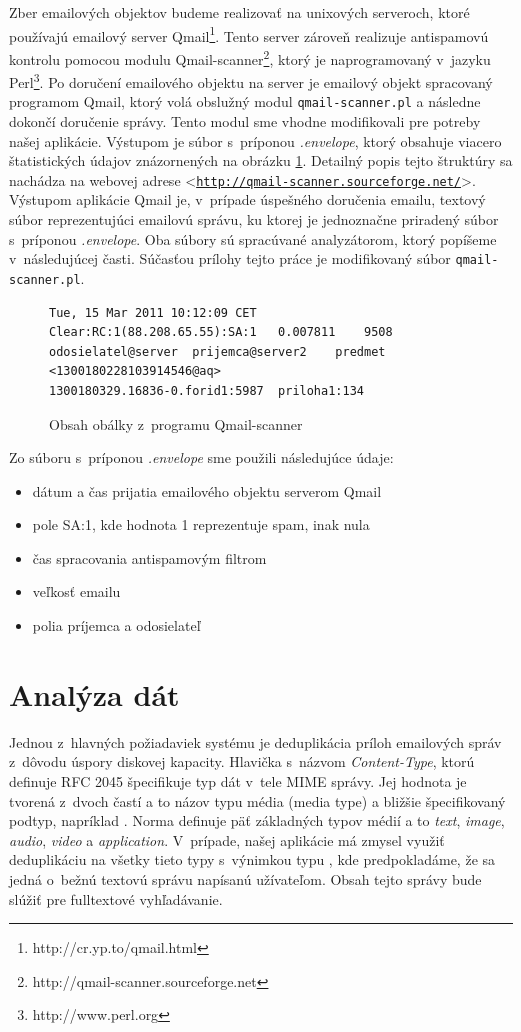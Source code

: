 \documentclass[11pt,twoside,a4paper]{book}
\let\oldUrl\url
\renewcommand\url[1]{<\texttt{\oldUrl{#1}}>}
\begin{document}
Zber emailových objektov budeme realizovať na unixových serveroch, ktoré používajú emailový server Qmail\footnote{http://cr.yp.to/qmail.html}. Tento server zároveň realizuje antispamovú kontrolu pomocou modulu Qmail-scanner\footnote{http://qmail-scanner.sourceforge.net}, ktorý je naprogramovaný v~jazyku Perl\footnote{http://www.perl.org}. Po doručení emailového objektu na server je emailový objekt spracovaný programom Qmail, ktorý volá obslužný modul \verb|qmail-scanner.pl| a následne dokončí doručenie správy. Tento modul sme vhodne modifikovali pre potreby našej aplikácie. Výstupom je súbor s~príponou \emph{.envelope}, ktorý obsahuje viacero štatistických údajov znázornených na obrázku \ref{fig:envelope}. Detailný popis tejto štruktúry sa nachádza na webovej adrese \url{http://qmail-scanner.sourceforge.net/}. Výstupom aplikácie Qmail je, v~prípade úspešného doručenia emailu, textový súbor reprezentujúci emailovú správu, ku ktorej je jednoznačne priradený súbor s~príponou \emph{.envelope}. Oba súbory sú spracúvané analyzátorom, ktorý popíšeme v~následujúcej časti. Súčasťou prílohy tejto práce je modifikovaný súbor \verb|qmail-scanner.pl|.

\begin{figure}[h]
\begin{verbatim}
Tue, 15 Mar 2011 10:12:09 CET	Clear:RC:1(88.208.65.55):SA:1	0.007811	9508	odosielatel@server	prijemca@server2	predmet	<1300180228103914546@aq>	
1300180329.16836-0.forid1:5987	priloha1:134
\end{verbatim}
 \caption{Obsah obálky z~programu Qmail-scanner}
 \label{fig:envelope}
\end{figure}

\noindent
Zo súboru s~príponou \emph{.envelope} sme použili následujúce údaje:
\begin{itemize}
 \item dátum a čas prijatia emailového objektu serverom Qmail
 \item pole SA:1, kde hodnota 1 reprezentuje spam, inak nula
 \item čas spracovania antispamovým filtrom
 \item veľkosť emailu
 \item polia príjemca a odosielateľ
\end{itemize}


\section{Analýza dát}
Jednou z~hlavných požiadaviek systému je deduplikácia príloh emailových správ z~dôvodu úspory diskovej kapacity. Hlavička s~názvom \emph{Content-Type}, ktorú definuje RFC 2045 špecifikuje typ dát v~tele MIME správy. Jej hodnota je tvorená z~dvoch častí a to názov typu média (media type) a bližšie špecifikovaný podtyp, napríklad \emph{}. Norma definuje päť základných typov médií a to \emph{text}, \emph{image}, \emph{audio}, \emph{video} a \emph{application}. V~prípade, našej aplikácie má zmysel využiť deduplikáciu na všetky tieto typy s~výnimkou typu \emph{}, kde predpokladáme, že sa jedná o~bežnú textovú správu napísanú užívateľom. Obsah tejto správy bude slúžiť pre fulltextové vyhľadávanie.
\end{document}
